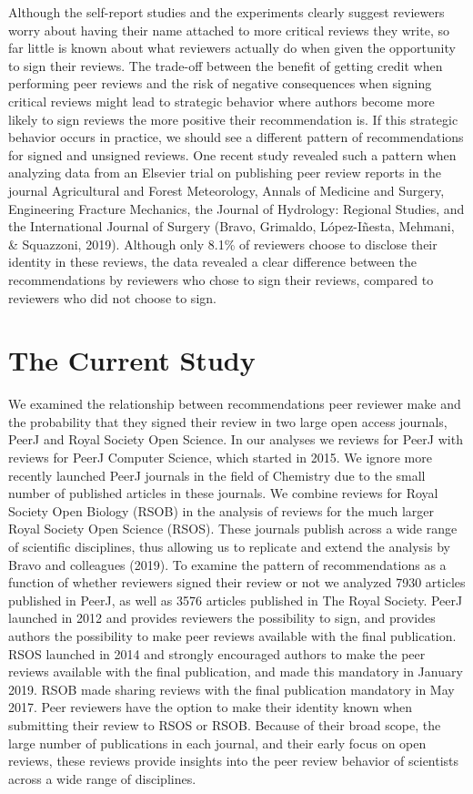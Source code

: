 \documentclass[,jou, a4paper,floatsintext]{apa6}
\begin{document}
Although the self-report studies and the experiments clearly suggest reviewers worry about having their name attached to more critical reviews they write, so far little is known about what reviewers actually do when given the opportunity to sign their reviews. The trade-off between the benefit of getting credit when performing peer reviews and the risk of negative consequences when signing critical reviews might lead to strategic behavior where authors become more likely to sign reviews the more positive their recommendation is. If this strategic behavior occurs in practice, we should see a different pattern of recommendations for signed and unsigned reviews. One recent study revealed such a pattern when analyzing data from an Elsevier trial on publishing peer review reports in the journal Agricultural and Forest Meteorology, Annals of Medicine and Surgery, Engineering Fracture Mechanics, the Journal of Hydrology: Regional Studies, and the International Journal of Surgery (Bravo, Grimaldo, López-Iñesta, Mehmani, \& Squazzoni, 2019). Although only 8.1\% of reviewers choose to disclose their identity in these reviews, the data revealed a clear difference between the recommendations by reviewers who chose to sign their reviews, compared to reviewers who did not choose to sign.

\hypertarget{the-current-study}{%
\section{The Current Study}\label{the-current-study}}

We examined the relationship between recommendations peer reviewer make and the probability that they signed their review in two large open access journals, PeerJ and Royal Society Open Science. In our analyses we reviews for PeerJ with reviews for PeerJ Computer Science, which started in 2015. We ignore more recently launched PeerJ journals in the field of Chemistry due to the small number of published articles in these journals. We combine reviews for Royal Society Open Biology (RSOB) in the analysis of reviews for the much larger Royal Society Open Science (RSOS). These journals publish across a wide range of scientific disciplines, thus allowing us to replicate and extend the analysis by Bravo and colleagues (2019). To examine the pattern of recommendations as a function of whether reviewers signed their review or not we analyzed 7930 articles published in PeerJ, as well as 3576 articles published in The Royal Society. PeerJ launched in 2012 and provides reviewers the possibility to sign, and provides authors the possibility to make peer reviews available with the final publication. RSOS launched in 2014 and strongly encouraged authors to make the peer reviews available with the final publication, and made this mandatory in January 2019. RSOB made sharing reviews with the final publication mandatory in May 2017. Peer reviewers have the option to make their identity known when submitting their review to RSOS or RSOB. Because of their broad scope, the large number of publications in each journal, and their early focus on open reviews, these reviews provide insights into the peer review behavior of scientists across a wide range of disciplines.
\end{document}
